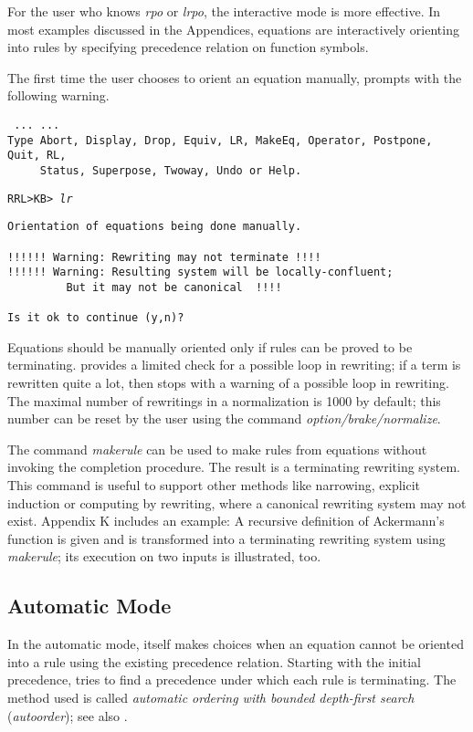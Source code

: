 For the user who knows {\em rpo} or {\em lrpo}, the interactive mode is more
effective.  In most examples discussed in the Appendices, equations
are interactively orienting into rules by specifying precedence
relation on function symbols.

The first time the user chooses to orient an equation manually,
\RRL prompts with the following
warning.
\begin{verbatim}
 ... ...
Type Abort, Display, Drop, Equiv, LR, MakeEq, Operator, Postpone, Quit, RL,
     Status, Superpose, Twoway, Undo or Help.
\end{verbatim}
\tt RRL>KB> {\em lr}
\begin{verbatim}
Orientation of equations being done manually.

!!!!!! Warning: Rewriting may not terminate !!!!
!!!!!! Warning: Resulting system will be locally-confluent;
         But it may not be canonical  !!!!

Is it ok to continue (y,n)?
\end{verbatim}
\rm  
Equations should be manually oriented only if rules can be proved to
be terminating. \RRL provides a limited check for a possible loop in
rewriting; if a term is rewritten quite a lot, then 
\RRL stops with a warning
of a possible loop in rewriting. The maximal number of rewritings
in a normalization is 1000 by default; this number can be reset
by the user using the command {\em option/brake/normalize}.

The command {\em makerule} can be used to
make rules from equations without invoking the completion procedure.
The result is a terminating rewriting system.
This command is useful to support other methods like
narrowing, explicit induction or computing by rewriting, 
where a canonical rewriting system may not exist.
Appendix K includes an example: A
recursive definition of Ackermann's function is given
and is transformed into a terminating rewriting system using
{\em makerule}; its execution on two inputs is illustrated, too.

\subsection{Automatic Mode}

In the automatic mode, \RRL itself makes choices when an equation
cannot be oriented into a rule using the existing precedence relation.
Starting with the initial precedence, \RRL tries to find a precedence
under which each rule is terminating. The method used is called 
{\em automatic ordering with bounded depth-first search} ({\em autoorder});
see also \cite{DetlefsForgaard}.
  

